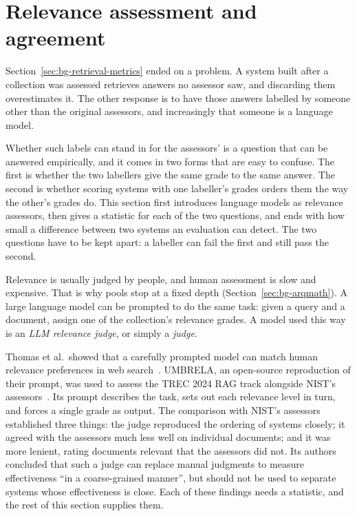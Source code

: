 \section{Relevance assessment and agreement}\label{sec:bg-agreement}


Section~\ref{sec:bg-retrieval-metrics} ended on a problem. A system built after a
collection was assessed retrieves answers no assessor saw, and discarding them
overestimates it. The other response is to have those answers labelled by someone
other than the original assessors, and increasingly that someone is a language model.

Whether such labels can stand in for the assessors' is a question that can be
answered empirically, and it comes in two forms that are easy to confuse. The first is
whether the two labellers give the same grade to the same answer. The second is
whether scoring systems with one labeller's grades orders them the way the other's
grades do. This section first introduces language models as relevance assessors, then gives a statistic for each of the two questions, and ends with how small a difference between two systems an evaluation can detect. The two questions have to be kept apart: a labeller can fail the first and still pass the second.

Relevance is usually judged by people, and human assessment is slow and expensive. That is why pools stop at a fixed depth
(Section~\ref{sec:bg-arqmath}). A large language model can be prompted to do the same
task: given a query and a document, assign one of the collection's relevance grades. A
model used this way is an \emph{LLM relevance judge}, or simply a \emph{judge}.

Thomas et al.\ showed that a carefully prompted model can match human relevance
preferences in web search~\cite{thomas2024llm}. UMBRELA, an open-source reproduction of
their prompt, was used to assess the TREC 2024 RAG track alongside NIST's
assessors~\cite{upadhyay2025umbrela}. Its prompt describes the task, sets out each
relevance level in turn, and forces a single grade as output. The comparison with
NIST's assessors established three things: the judge reproduced the ordering of
systems closely; it agreed with the assessors much less well on individual documents;
and it was more lenient, rating documents relevant that the assessors did not. Its
authors concluded that such a judge can replace manual judgments to measure
effectiveness ``in a coarse-grained manner'', but should not be used to separate
systems whose effectiveness is close. Each of these findings needs a statistic, and
the rest of this section supplies them.

